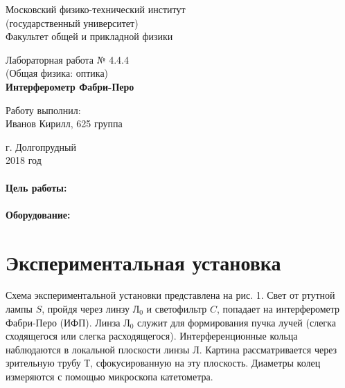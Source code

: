 \documentclass[12pt]{kiarticle}
\begin{document}
	
	\begin{titlepage}
	\begin{center}
		\large 	Московский физико-технический институт \\
		(государственный университет) \\
		Факультет общей и прикладной физики \\
		\vspace{0.2cm}
		
		\vspace{4.5cm}
		Лабораторная работа № 4.4.4 \\ \vspace{0.2cm}
		\large (Общая физика: оптика) \\ \vspace{0.2cm}
		\LARGE \textbf{Интерферометр Фабри-Перо}
	\end{center}
	\vspace{2.3cm} \large
	
	\begin{center}
		Работу выполнил: \\
		Иванов Кирилл,
		625 группа
		\vspace{10mm}		
		
	\end{center}
	
	\begin{center} \vspace{60mm}
		г. Долгопрудный \\
		2018 год
	\end{center}
\end{titlepage}
	
	\paragraph*{Цель работы:} 
	
	\paragraph*{Оборудование:} 
	
	\section{Экспериментальная установка}
	
	Схема экспериментальной установки представлена на рис. 1. Свет от ртутной лампы $ S $, пройдя через линзу $ Л_0 $ и светофильтр $ C $, попадает на интерферометр Фабри-Перо (ИФП). Линза $ Л_0 $ служит для
	формирования пучка лучей (слегка сходящегося или слегка расходящегося). Интерференционные кольца наблюдаются в локальной плоскости линзы $ Л $. Картина рассматривается через зрительную трубу $ Т $, сфокусированную на эту плоскость. Диаметры колец измеряются с помощью микроскопа катетометра.
	
\end{document}
